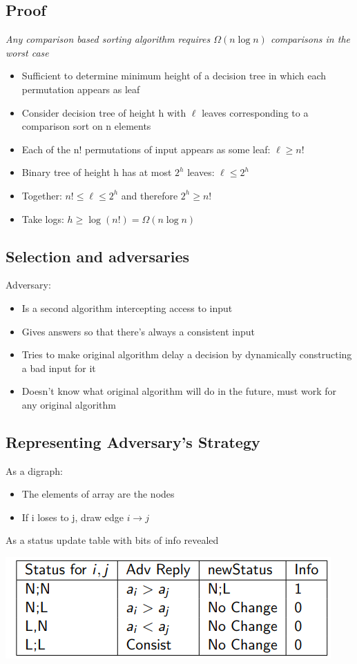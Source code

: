 \documentclass{article}[18pt]
\begin{document}
\subsection{Proof}
\begin{center}
\textit{Any comparison based sorting algorithm requires $\Omega(n\log n)$ comparisons in the worst case}
\end{center}
\begin{itemize}
	\item Sufficient to determine minimum height of a decision tree in which each permutation appears as leaf
	\item Consider decision tree of height h with $\ell$ leaves corresponding to a comparison sort on n elements
	\item Each of the n! permutations of input appears as some leaf: $\ell\geqslant n!$
	\item Binary tree of height h has at most $2^h$ leaves: $\ell\leqslant 2^h$
	\item Together: $n!\leqslant \ell\leqslant 2^h$ and therefore $2^h\geqslant n!$
	\item Take logs: $h\geqslant \log(n!)=\Omega(n\log n)$
\end{itemize}
\subsection{Selection and adversaries}
Adversary:
\begin{itemize}
	\item Is a second algorithm intercepting access to input
	\item Gives answers so that there's always a consistent input
	\item Tries to make original algorithm delay a decision by dynamically constructing a bad input for it
	\item Doesn't know what original algorithm will do in the future, must work for any original algorithm
\end{itemize}
\subsection{Representing Adversary's Strategy}
As a digraph:
\begin{itemize}
	\item The elements of array are the nodes
	\item If i loses to j, draw edge $i\rightarrow j$ 
\end{itemize}
As a status update table with bits of info revealed
\begin{center}
	\includegraphics[scale=0.7]{adversary}
\end{center}
\end{document}

